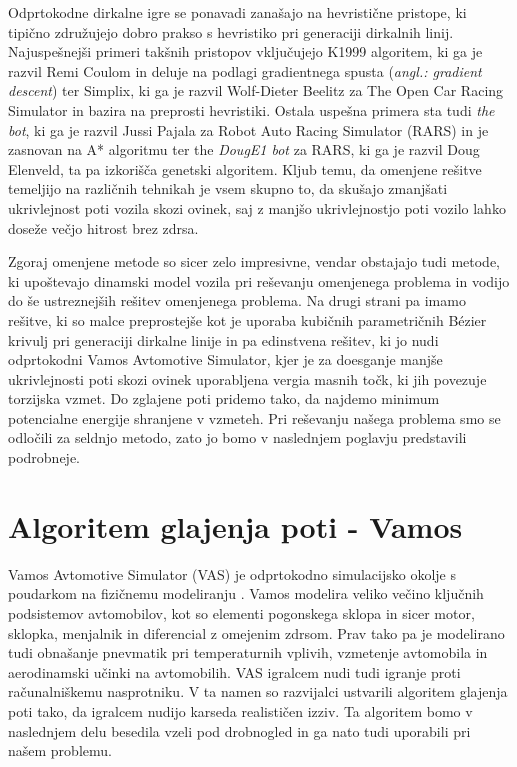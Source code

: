 \documentclass[10pt,a4paper]{article}
\begin{document}
Odprtokodne dirkalne igre se ponavadi zanašajo na hevristične pristope, ki tipično združujejo dobro prakso s hevristiko pri generaciji dirkalnih linij. Najuspešnejši primeri takšnih pristopov vključujejo K1999 algoritem, ki ga je razvil Remi Coulom in deluje na podlagi gradientnega spusta (\textit{angl.: gradient descent}) ter Simplix, ki ga je razvil Wolf-Dieter Beelitz za The Open Car Racing Simulator in bazira na preprosti hevristiki. Ostala uspešna primera sta tudi \textit{the bot}, ki ga je razvil Jussi Pajala za Robot Auto Racing Simulator (RARS) in je zasnovan na A* algoritmu ter the \textit{DougE1 bot} za RARS, ki ga je razvil Doug Elenveld, ta pa izkorišča genetski algoritem. Kljub temu, da omenjene rešitve temeljijo na različnih tehnikah je vsem skupno to, da skušajo zmanjšati ukrivlejnost poti vozila skozi ovinek, saj z manjšo ukrivlejnostjo poti vozilo lahko doseže večjo hitrost brez zdrsa.

Zgoraj omenjene metode so sicer zelo impresivne, vendar obstajajo tudi metode, ki upoštevajo dinamski model vozila pri reševanju omenjenega problema in vodijo do še ustreznejših rešitev omenjenega problema. Na drugi strani pa imamo rešitve, ki so malce preprostejše kot je uporaba kubičnih parametričnih Bézier krivulj pri generaciji dirkalne linije in pa edinstvena rešitev, ki jo nudi odprtokodni Vamos Avtomotive Simulator, kjer je za doesganje manjše ukrivlejnosti poti skozi ovinek uporabljena vergia masnih točk, ki jih povezuje torzijska vzmet. Do zglajene poti pridemo tako, da najdemo minimum potencialne energije shranjene v vzmeteh. Pri reševanju našega problema smo se odločili za seldnjo metodo, zato jo bomo v naslednjem poglavju predstavili podrobneje.

\section{Algoritem glajenja poti - Vamos}

Vamos Avtomotive Simulator (VAS) je odprtokodno simulacijsko okolje s poudarkom na fizičnemu modeliranju \cite{VAS}. Vamos modelira veliko večino ključnih podsistemov avtomobilov, kot so elementi pogonskega sklopa in sicer motor, sklopka, menjalnik in diferencial z omejenim zdrsom. Prav tako pa je modelirano tudi obnašanje pnevmatik pri temperaturnih vplivih, vzmetenje avtomobila in aerodinamski učinki na avtomobilih. VAS igralcem nudi tudi igranje proti računalniškemu nasprotniku. V ta namen so razvijalci ustvarili algoritem glajenja poti tako, da igralcem nudijo karseda realističen izziv. Ta algoritem bomo v naslednjem delu besedila vzeli pod drobnogled in ga nato tudi uporabili pri našem problemu.
\end{document}
